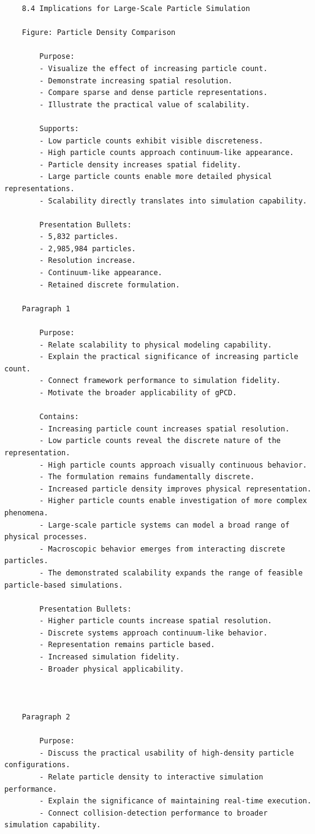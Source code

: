 \begin{verbatim}
	8.4 Implications for Large-Scale Particle Simulation
	
	Figure: Particle Density Comparison

		Purpose:
		- Visualize the effect of increasing particle count.
		- Demonstrate increasing spatial resolution.
		- Compare sparse and dense particle representations.
		- Illustrate the practical value of scalability.

		Supports:
		- Low particle counts exhibit visible discreteness.
		- High particle counts approach continuum-like appearance.
		- Particle density increases spatial fidelity.
		- Large particle counts enable more detailed physical representations.
		- Scalability directly translates into simulation capability.

		Presentation Bullets:
		- 5,832 particles.
		- 2,985,984 particles.
		- Resolution increase.
		- Continuum-like appearance.
		- Retained discrete formulation.

	Paragraph 1

		Purpose:
		- Relate scalability to physical modeling capability.
		- Explain the practical significance of increasing particle count.
		- Connect framework performance to simulation fidelity.
		- Motivate the broader applicability of gPCD.

		Contains:
		- Increasing particle count increases spatial resolution.
		- Low particle counts reveal the discrete nature of the representation.
		- High particle counts approach visually continuous behavior.
		- The formulation remains fundamentally discrete.
		- Increased particle density improves physical representation.
		- Higher particle counts enable investigation of more complex phenomena.
		- Large-scale particle systems can model a broad range of physical processes.
		- Macroscopic behavior emerges from interacting discrete particles.
		- The demonstrated scalability expands the range of feasible particle-based simulations.

		Presentation Bullets:
		- Higher particle counts increase spatial resolution.
		- Discrete systems approach continuum-like behavior.
		- Representation remains particle based.
		- Increased simulation fidelity.
		- Broader physical applicability.



	Paragraph 2

		Purpose:
		- Discuss the practical usability of high-density particle configurations.
		- Relate particle density to interactive simulation performance.
		- Explain the significance of maintaining real-time execution.
		- Connect collision-detection performance to broader simulation capability.


\end{verbatim}
